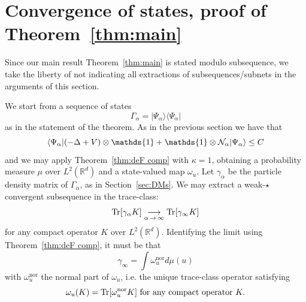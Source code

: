 \documentclass[10pt]{amsart}
\theoremstyle{definition}\newtheorem{defi}[theo]{Definition}\newtheorem{rema}[theo]{Remark}\newtheorem{exam}[theo]{Example}\newtheorem{exem}[theo]{Example}\newtheorem{nota}[theo]{Notation}
\DeclareMathOperator{\Tr}{Tr}
\DeclareMathOperator{\nor}{nor}
\newcommand{\R}{\mathbb{R}}
\newcommand{\cN}{\mathcal{N}}
\newcommand{\1}{\mathds{1}}
\renewcommand*{\to}{\mathchoice{\longrightarrow}{\rightarrow}{\rightarrow}{\rightarrow}}
\let\originalleft\left
\let\originalright\right
\renewcommand{\left}{\mathopen{}\mathclose\bgroup\originalleft}
\renewcommand{\right}{\aftergroup\egroup\originalright}
\begin{document}
\section{Convergence of states, proof of Theorem~\ref{thm:main}}\label{sec:limit}

Since our main result Theorem~\ref{thm:main} is stated modulo subsequence, we take the liberty of not indicating all extractions of subsequences/subnets in the arguments of this section.

We start from a sequence of states
\begin{equation*}
\Gamma_\alpha = |\Psi_\alpha\rangle \langle \Psi_\alpha |
\end{equation*}
as in the statement of the theorem. As in the previous section we have that
\begin{equation}\label{eq:apriori bis}
\left\langle\Psi_\alpha| \left(- \Delta + V \right) \otimes \1 + \1 \otimes \cN_\alpha | \Psi_\alpha \right\rangle \leq C
\end{equation}
and we may apply Theorem~\ref{thm:deF comp} with $\kappa = 1$, obtaining a probability measure $\mu$ over $L^2 (\R^d)$ and a state-valued map $\omega_u$. Let $\gamma_\alpha$ be the particle density matrix of $\Gamma_\alpha$, as in Section~\ref{sec:DMs}. We may extract a weak-$\star$ convergent subsequence in the trace-class:
\begin{equation}\label{eq:weak star}
\Tr \left[\gamma_\alpha K \right] \underset{\alpha\,\to\,\infty}{\to} \Tr \left[\gamma_\infty K \right]
\end{equation}
for any compact operator $K$ over $L^2(\R^d)$. Identifying the limit using Theorem~\ref{thm:deF comp}, it must be that
\begin{equation}\label{eq:gamma inf}
\gamma_\infty = \int \omega_u ^{\nor} d\mu (u)
\end{equation}
with $\omega_u ^{\nor}$ the normal part of $\omega_u$, i.e. the unique trace-class operator satisfying
\begin{equation}\label{eq:normal part}
\omega_u (K) = \Tr \left[\omega_u ^{\nor} K \right] \text{ for any compact operator } K.
\end{equation}
\end{document}
